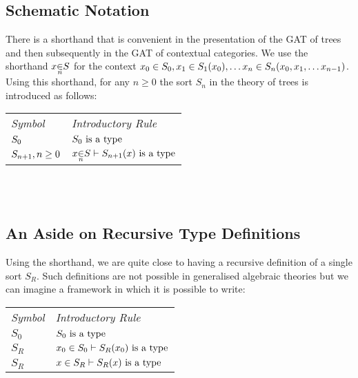 \documentclass[10pt,a4paper]{article}
\begin{document}
\subsection {Schematic Notation}
\newcommand{\ft}[1]{
#1 \kern-6pt \raisebox{1.1ex}{$\leftrightline$} \kern-3pt \raisebox{.1ex}{$\downarrow$}}
\newcommand{\bbin}[1]{
\raisebox{-0.5em}{$\stackrel{\displaystyle{\in}} {\scriptstyle{#1}}$}
}
\newcommand{\ofTn}[3]{
#1 \bbin{#2} #3}

There is a  shorthand that is convenient in the presentation  of the GAT of trees  and then subsequently in the GAT of contextual categories. We use the shorthand
$\ofTn{x}{n}{S}$ for the context $x_0 \in S_0,x_1 \in S_{1}(x_0), \hdots x_n \in S_{n}(x_0,x_1,\hdots x_{n-1}) $. \\

\noindent Using this shorthand, for any $n \geq 0$ the sort $S_n$  in the theory of trees is introduced as follows: \\

\vspace{0.03cm} 
\begin{tabular}{>{\itshape}l l}
Symbol & \itshape{Introductory Rule} \\
$S_0  $     & $S_0\mbox{ is a type}$\\
$S_{n+1}, n \geq 0 $ & $\ofTn{x}{n}{S}    \tstyle \isT{\Si{n+1}(x)} $\\
\end{tabular} \\
\vspace{.1cm}  \\


\subsection {An Aside on Recursive Type Definitions}

Using the shorthand, we are quite close to having a recursive definition of a single sort $S_R$.
Such definitions are not possible in generalised algebraic theories but we can imagine a framework in which it is possible to write: \\
\vspace{0.03cm} 
\begin{tabular}{>{\itshape}l l}
Symbol & \itshape{Introductory Rule} \\
$S_0  $     & $S_0\mbox{ is a type}$\\
$S_R  $     & $x_0 \in S_0    \vdash S_R(x_0)\mbox{ is a type} $\\
$S_R $      & $x \in S_R    \vdash S_R(x)\mbox{ is a type} $\\
\end{tabular} \\
\vspace{.1cm}  \\
\end{document}
